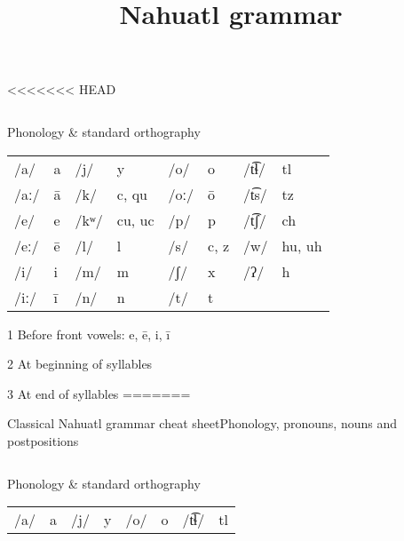 \documentclass[12pt]{beamer}
\title{Nahuatl grammar}
\newcommand{\nah}[1]{\textcolor{nahgrn}{#1}}
\begin{document}
<<<<<<< HEAD
\begin{frame}%
  \begin{columns}[t]
    \begin{column}{.22\linewidth}
      \begin{block}{Phonology \& standard orthography}
        \begin{threeparttable}
          \begin{tabular}{l@{\,}l@{\qquad}l@{\,}l@{\qquad}l@{\,}l@{\qquad}l@{\,}l}
            /a/  & \nah{a} & /j/ & \nah{y} & /o/ & \nah{o} & /t͡ɬ/ & \nah{tl} \\
            /aː/ & \nah{ā} & /k/  & \nah{c}, \nah{qu}\tnote{1}           & /oː/ & \nah{ō}                   & /t͡s/ & \nah{tz}                             \\
            /e/  & \nah{e} & /kʷ/ & \nah{cu}\tnote{2}, \nah{uc}\tnote{3} & /p/  & \nah{p}                   & /t͡ʃ/ & \nah{ch}                             \\
            /eː/ & \nah{ē} & /l/  & \nah{l}                              & /s/  & \nah{c}\tnote{1}, \nah{z} & /w/   & \nah{hu}\tnote{2}, \nah{uh}\tnote{3} \\
            /i/  & \nah{i} & /m/ & \nah{m} & /ʃ/ & \nah{x} & /ʔ/   & \nah{h}  \\
            /iː/ & \nah{ī} & /n/ & \nah{n} & /t/ & \nah{t} &       &         
          \end{tabular}
          \begin{tablenotes}
          \item[1] Before front vowels: \nah{e, ē, i, ī}
          \item[2] At beginning of syllables
          \item[3] At end of syllables  
=======
\begin{frame}%
  {Classical Nahuatl grammar cheat sheet}{Phonology, pronouns, nouns and postpositions}
  \begin{columns}[t]
    \begin{column}{.23\linewidth}
      \begin{block}{Phonology \& standard orthography}
        \begin{threeparttable}
          \begin{tabular}{l@{\,}l@{\qquad}l@{\,}l@{\qquad}l@{\,}l@{\qquad}l@{\,}l}
            /a/  & \nah{a} & /j/  & \nah{y}                              & /o/  & \nah{o}                   & /t͡ɬ/ & \nah{tl}                             \\

\end{tabular}
\end{threeparttable}
\end{block}
\end{column}
\end{columns}
\end{frame}
\end{tablenotes}
\end{threeparttable}
\end{block}
\end{column}
\end{columns}
\end{frame}
\end{document}
